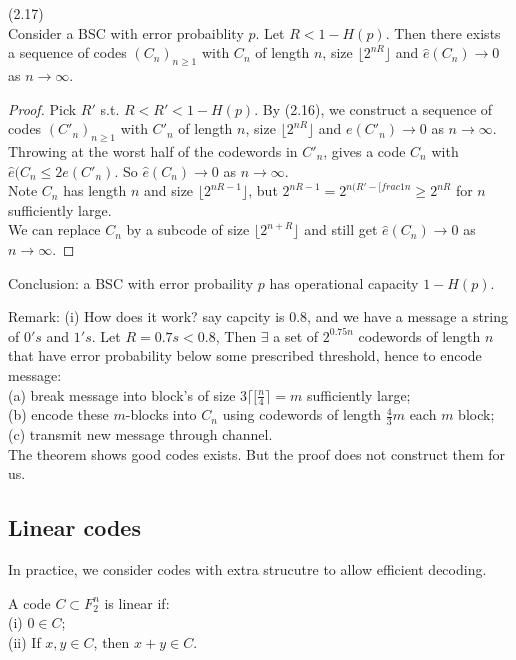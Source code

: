 \documentclass[a4paper]{article}
\begin{document}
\begin{prop} (2.17)\\
Consider a BSC with error probaiblity $p$. Let $R<1-H(p)$. Then there exists a sequence of codes $(C_n)_{n \geq 1}$ with $C_n$ of length $n$, size $\lfloor 2^{nR}\rfloor$ and $\hat{e}(C_n) \to 0$ as $n \to \infty$.
\begin{proof}
Pick $R'$ s.t. $R < R' < 1-H(p)$. By (2.16), we construct a sequence of codes $(C'_n)_{n \geq 1}$ with $C'_n$ of length $n$, size $\lfloor 2^{nR} \rfloor$ and $e(C'_n) \to 0$ as $n \to \infty$.\\
Throwing at the worst half of the codewords in $C'_n$, gives a code $C_n$ with $\hat{e}(C_n \leq 2e(C'_n)$. So $\hat{e}(C_n) \to 0$ as $n \to \infty$.\\
Note $C_n$ has length $n$ and size $\lfloor 2^{nR-1} \rfloor$, but $2^{nR-1} = 2^{n(R'-[frac{1}{n}} \geq 2^{nR}$ for $n$ sufficiently large.\\
We can replace $C_n$ by a subcode of size $\lfloor 2^{n+R}\rfloor$ and still get $\hat{e}(C_n) \to 0$ as $n \to \infty$.
\end{proof}
\end{prop}

Conclusion: a BSC with error probaility $p$ has operational capacity $1-H(p)$.

Remark: (i) How does it work? say capcity is 0.8, and we have a message a string of $0's$ and $1's$. Let $R=0.7s < 0.8$, Then $\exists$ a set of $2^{0.75n}$ codewords of length $n$ that have error probability below some prescribed threshold, hence to encode message:\\
(a) break message into block's of size $3\lceil[\frac{n}{4}\rceil = m$ sufficiently large;\\
(b) encode these $m$-blocks into $C_n$ using codewords of length $\frac{4}{3} m$ each $m$ block;\\
(c) transmit new message through channel.\\

The theorem shows good codes exists. But the proof does not construct them for us.

\subsection{Linear codes}
In practice, we consider codes with extra strucutre to allow efficient decoding.

\begin{defi}
A code $C \subset F_2^n$ is linear if:\\
(i) $0 \in C$;\\
(ii) If $x,y \in C$, then $x+y \in C$.
\end{defi}
\end{document}
